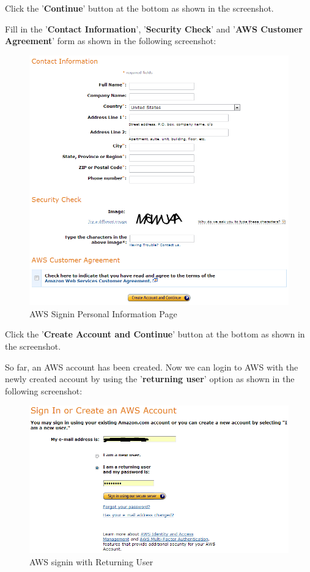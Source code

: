Click the '\textbf{Continue}' button at the bottom as shown in the screenshot.

Fill in the '\textbf{Contact Information}', '\textbf{Security Check}' and '\textbf{AWS Customer Agreement}' form as shown in the following screenshot:
\begin{figure}[h]
  \centering
  \includegraphics[width=.8\textwidth]{figs/5163os_08_03.png}
  \caption{AWS Signin Personal Information Page}\label{fig:aws.personal.info}
\end{figure} 

Click the '\textbf{Create Account and Continue}' button at the bottom as shown in the screenshot.

So far, an AWS account has been created. Now we can login to AWS with the newly created account by using the '\textbf{returning user}' option as shown in the following screenshot:
\begin{figure}[h]
  \centering
  \includegraphics[width=.8\textwidth]{figs/5163os_08_04.png}
  \caption{AWS signin with Returning User}\label{fig:aws.signin.return}
\end{figure} 


